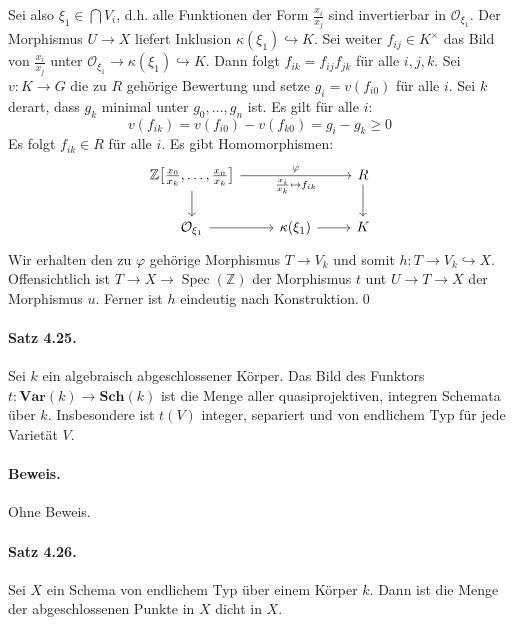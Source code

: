 Sei also $\xi_1\in\bigcap V_i$, d.h. alle Funktionen der Form $\frac{x_i}{x_j}$ sind invertierbar in $\mathcal{O}_{\xi_1}$. Der Morphismus $U\to X$ liefert Inklusion $\kappa(\xi_1)\hookrightarrow K$. Sei weiter $f_{ij}\in K^\times$ das Bild von $\frac{x_i}{x_j}$ unter $\mathcal{O}_{\xi_1}\to \kappa(\xi_1)\hookrightarrow K$. Dann folgt $f_{ik}=f_{ij}f_{jk}$ für alle $i,j,k$. Sei $v:K\to G$ die zu $R$ gehörige Bewertung und setze $g_i=v(f_{i0})$ für alle $i$. Sei $k$ derart, dass $g_k$ minimal unter $g_0,\ldots,g_n$ ist. Es gilt für alle $i$:
\[v(f_{ik})=v(f_{i0})-v(f_{k0})=g_i-g_k\geq 0 \]
Es folgt $f_{ik}\in R$ für alle $i$. Es gibt Homomorphismen:
\[\begin{tikzcd}
\mathbb{Z}\big[\frac{x_0}{x_k},\ldots,\frac{x_n}{x_k}\big]\ar[rr, "\varphi", "\frac{x_i}{x_k}\mapsto f_{ik}"'] \ar[d]&& R\ar[d]\\
\mathcal{O}_{\xi_1}\ar[r] & \kappa(\xi_1)\ar[r] & K
\end{tikzcd}\]
Wir erhalten den zu $\varphi$ gehörige Morphismus $T\to V_k$ und somit $h:T\to V_k\hookrightarrow X$. Offensichtlich ist $T\to X\to\operatorname{Spec}(\mathbb{Z})$ der Morphismus $t$ unt $U\to T\to X$ der Morphismus $u$. Ferner ist $h$ eindeutig nach Konstruktion.\qed

\paragraph{Satz 4.25.}\label{4.25} Sei $k$ ein algebraisch abgeschlossener Körper. Das Bild des Funktors $t:\mathbf{Var}(k)\to \mathbf{Sch}(k)$ ist die Menge aller quasiprojektiven, integren Schemata über $k$. Insbesondere ist $t(V)$ integer, separiert und von endlichem Typ für jede Varietät $V$.

\paragraph{Beweis.} Ohne Beweis.

\paragraph{Satz 4.26.}\label{4.26} Sei $X$ ein Schema von endlichem Typ über einem Körper $k$. Dann ist die Menge der abgeschlossenen Punkte in $X$ dicht in $X$.

\iffalse
\paragraph{Beweis.} Es genügt die Aussage für affine Schemata zu zeigen. Sei $X=\operatorname{Spec}(A)$ mit einer endlich erzeugten $k$-Algebra $A$ und $\mathfrak{M}$ die Menge der abgeschlossenen Punkte von $\operatorname{Spec}(A)$. Sei $f\in A$ mit $D(f)\neq\varnothing$. Wir zeigen $\mathfrak{M}\cap D(f)\neq\varnothing$. Es ist $D(f)\cong\operatorname{Spec}(A_f)$. Es existiert ein abgeschlossener Punkt $y\in \operatorname{Spec}(A_f)$, d.h. ein Maximalideal in $A_f$. Nun ist $A_f=A\big[\frac{1}{f}\big]$ endlich erzeugt über $k$, also $\kappa(y)=A_f/y$ eine algebraische Erweiterung von $k$ nach dem Hilbertschen Nullstellensatz. Sei $x$ der zu $y$ gehörige Punkt in $D(f)$.
\fi

